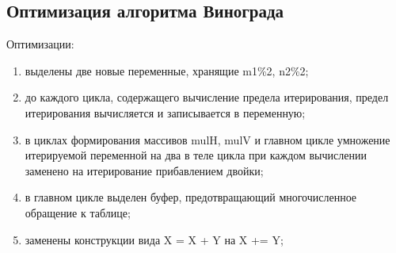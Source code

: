 \documentclass{article}
\begin{document}
	 	\subsection{Оптимизация алгоритма Винограда}
	 	Оптимизации:
	 	\begin{enumerate}
	 	\item выделены две новые переменные, хранящие m1\%2, n2\%2;
	 	\item до каждого цикла, содержащего вычисление предела итерирования, предел итерирования вычисляется и записывается в переменную;
	 	\item в циклах формирования массивов mulH, mulV и главном цикле умножение итерируемой переменной на два в теле цикла при каждом вычислении заменено на итерирование прибавлением двойки;
	 	\item в главном цикле выделен буфер, предотвращающий многочисленное обращение к таблице;
		\item заменены конструкции вида X = X + Y на X += Y;
	 	\end{enumerate}
\end{document}
